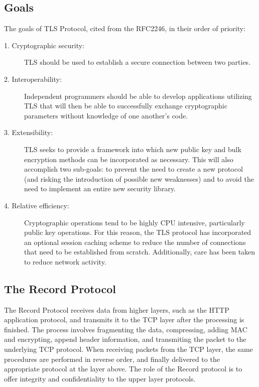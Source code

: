 \documentclass[12pt,a4paper,titlepage]{report}
\begin{document}
\subsection{Goals}
The goals of TLS Protocol, cited from the RFC2246\cite{rfc2246}, in their order of priority:
\begin{description}
\item[1. Cryptographic security:] {TLS should be used to establish a secure connection between two parties.}

\item[2. Interoperability:] {Independent programmers should be able to develop applications utilizing TLS that will then be able to successfully exchange cryptographic parameters without knowledge of one another's code.}

\item[3. Extensibility:] {TLS seeks to provide a framework into which new public key and bulk encryption methods can be incorporated as necessary. This will also accomplish two sub-goals: to prevent the need to create a new protocol (and risking the introduction of possible new weaknesses) and to avoid the need to implement an entire new security library.}

\item[4. Relative efficiency:] {Cryptographic operations tend to be highly CPU intensive, particularly public key operations. For this reason, the TLS protocol has incorporated an optional session caching scheme to reduce the number of connections that need to be established from scratch. Additionally, care has been taken to reduce network activity.}
\end{description}

\subsection{The Record Protocol}
The Record Protocol receives data from higher layers, such as the HTTP application protocol, and transmits it to the TCP layer after the processing is finished. The process involves fragmenting the data, compressing, adding MAC and encrypting, append header information, and transmiting the packet to the underlying TCP protocol. When receiving packets from the TCP layer, the same procedures are performed in reverse order, and finally delivered to the appropriate protocol at the layer above. The role of the Record protocol is to offer integrity and confidentiality to the upper layer protocols. \cite{berbecaru, rfc2246}
\end{document}
